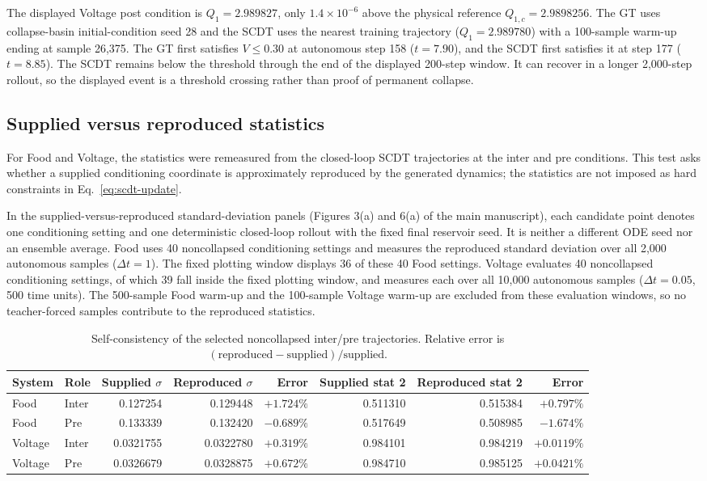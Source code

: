 \documentclass[10pt,a4paper]{article}
\begin{document}
The displayed Voltage post condition is $Q_1=2.989827$, only
$1.4\times10^{-6}$ above the physical reference $Q_{1,c}=2.9898256$. The GT
uses collapse-basin initial-condition seed 28 and the SCDT uses the nearest
training trajectory ($Q_1=2.989780$) with a 100-sample warm-up ending at sample
26,375. The GT first satisfies $V\le0.30$ at autonomous step 158
($t=7.90$), and the SCDT first satisfies it at step 177 ($t=8.85$).
The SCDT remains below the threshold through the end of the displayed
200-step window. It can recover in a longer 2,000-step rollout, so the
displayed event is a threshold crossing rather than proof of permanent collapse.

\subsection{Supplied versus reproduced statistics}

For Food and Voltage, the statistics were remeasured from the closed-loop SCDT
trajectories at the inter and pre conditions. This test asks whether a supplied
conditioning coordinate is approximately reproduced by the generated dynamics;
the statistics are not imposed as hard constraints in Eq.~\eqref{eq:scdt-update}.

In the supplied-versus-reproduced standard-deviation panels (Figures 3(a) and
6(a) of the main manuscript), each candidate point denotes one conditioning
setting and one deterministic closed-loop rollout with the fixed final reservoir
seed. It is neither a different ODE seed nor an ensemble average. Food uses 40
noncollapsed conditioning settings and measures the reproduced standard
deviation over all 2,000 autonomous samples ($\Delta t=1$). The fixed plotting
window displays 36 of these 40 Food settings. Voltage evaluates 40
noncollapsed conditioning settings, of which 39 fall inside the fixed plotting
window, and measures each over all 10,000 autonomous samples
($\Delta t=0.05$, 500 time units). The 500-sample Food warm-up and the
100-sample Voltage warm-up are excluded from these evaluation windows, so no
teacher-forced samples contribute to the reproduced statistics.

\begin{table}[ht]
\centering
\caption{Self-consistency of the selected noncollapsed inter/pre trajectories.
Relative error is $(\text{reproduced}-\text{supplied})/\text{supplied}$.}
\label{tab:self-consistency}
\small
\begin{tabular}{@{}llrrrrrr@{}}
\toprule
System & Role & Supplied $\sigma$ & Reproduced $\sigma$ & Error & Supplied stat 2 & Reproduced stat 2 & Error \\
\midrule
Food & Inter & 0.127254 & 0.129448 & $+1.724\%$ & 0.511310 & 0.515384 & $+0.797\%$ \\
Food & Pre & 0.133339 & 0.132420 & $-0.689\%$ & 0.517649 & 0.508985 & $-1.674\%$ \\
Voltage & Inter & 0.0321755 & 0.0322780 & $+0.319\%$ & 0.984101 & 0.984219 & $+0.0119\%$ \\
Voltage & Pre & 0.0326679 & 0.0328875 & $+0.672\%$ & 0.984710 & 0.985125 & $+0.0421\%$ \\
\bottomrule
\end{tabular}
\end{table}
\end{document}
